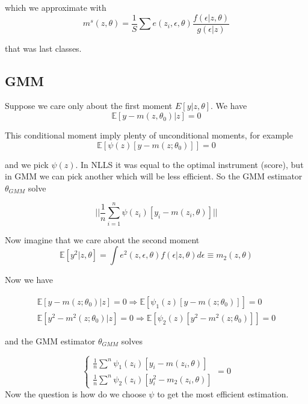 \documentclass[12pt]{article}
\begin{document}
which we approximate with 
\begin{equation*}
	m^s(z,\theta) = \frac{1}{S} \sum e(z_i, \epsilon, \theta) \frac{f(\epsilon | z, \theta)}{g(\epsilon | z)}
\end{equation*}

that was last classes. 

\subsection*{GMM}

Suppose we care only about the first moment $E[y | z, \theta]$. We have
\begin{equation*}
	\mathbb{E}[y - m(z, \theta_0) | z] = 0
\end{equation*}

This conditional moment imply plenty of unconditional moments, for example
\begin{equation*}
	\mathbb{E}[\psi(z) [y - m(z;\theta_0)]] = 0
\end{equation*}

and we pick $\psi(z)$. In NLLS it was equal to the optimal instrument (score), but in GMM we can pick another which will be less efficient. So the GMM estimator $\theta_{GMM}$ solve

\begin{equation*}
	|| \frac{1}{n} \sum^n_{i=1} \psi(z_i) [y_i - m(z_i, \theta) ] || 
\end{equation*}

Now imagine that we care about the second moment
\begin{equation*}
	\mathbb{E}[y^2 | z, \theta] = \int e^2(z, \epsilon, \theta) f(\epsilon | z, \theta) d \epsilon \equiv m_2(z,\theta)
\end{equation*}

Now we have 

\begin{eqnarray*}
	\mathbb{E}[ y - m(z;\theta_0) | z] = 0 \Rightarrow  \mathbb{E}[\psi_1(z) [y - m(z;\theta_0)]] = 0\\
	\mathbb{E}[y^2 - m^2(z;\theta_0) | z] = 0  \Rightarrow  \mathbb{E}[\psi_2(z) [y^2 - m^2(z;\theta_0)]] = 0
\end{eqnarray*}

and the GMM estimator $\theta_{GMM}$ solves 

\begin{equation*}
	\begin{cases}
		\frac{1}{n} \sum^n \psi_1(z_i) [y_i - m(z_i, \theta)]  \\
		\frac{1}{n} \sum^n \psi_2(z_i) [y_i^2 - m_2(z_i, \theta)] 
	\end{cases} 
	= 0 
\end{equation*}
Now the question is how do we choose $\psi$ to get the most efficient estimation. 
\end{document}
